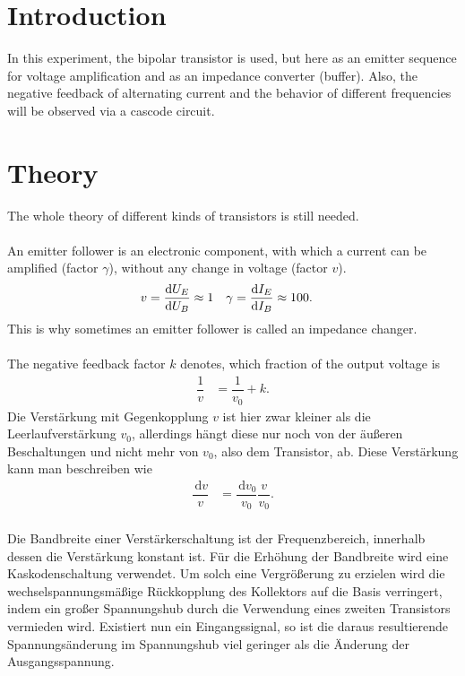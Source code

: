 \documentclass[a4paper,10pt]{article}
\newcommand{\td}{\,\text{d}}
\numberwithin{equation}{section}
\begin{document}
\begin{multicols}{2}
	\sloppy
	\section{Introduction}
	In this experiment, the bipolar transistor is used, but here as an emitter sequence for voltage amplification and as an impedance converter (buffer).
	Also, the negative feedback of alternating current and the behavior of different frequencies will be observed via a cascode circuit.

	\section{Theory}
	The whole theory of different kinds of transistors is still needed.
	\\\\An emitter follower is an electronic component, with which a current can be amplified (factor $\gamma $), without any change in voltage (factor $v$).
	\begin{align}
		v & = \diff[]{U_E}{U_B}\approx 1 & \gamma & = \diff[]{I_E}{I_B}\approx 100
		.\end{align}
	This is why sometimes an emitter follower is called an impedance changer.
	\\\\ The negative feedback factor $k$ denotes, which fraction of the output voltage is
	\begin{align}
		\dfrac{1}{v} & = \dfrac{1}{v_0}+k
		.\end{align}
	Die Verstärkung mit Gegenkopplung $v$ ist hier zwar kleiner als die Leerlaufverstärkung $v_0$, allerdings hängt diese nur noch von der äußeren Beschaltungen und nicht mehr von $v_0$, also dem Transistor, ab.
	Diese Verstärkung kann man beschreiben wie
	\begin{align}
		\dfrac{\td v}{v} & = \dfrac{\td v_0}{v_0}\dfrac{v}{v_0}
		.\end{align}
	\\Die Bandbreite einer Verstärkerschaltung ist der Frequenzbereich, innerhalb dessen die Verstärkung konstant ist.
	Für die Erhöhung der Bandbreite wird eine Kaskodenschaltung verwendet.
	Um solch eine Vergrößerung zu erzielen wird die wechselspannungsmäßige Rückkopplung des Kollektors auf die Basis verringert, indem ein großer Spannungshub durch die Verwendung eines zweiten Transistors vermieden wird.
	Existiert nun ein Eingangssignal, so ist die daraus resultierende Spannungsänderung im Spannungshub viel geringer als die Änderung der Ausgangsspannung.

\end{multicols}
\end{document}
